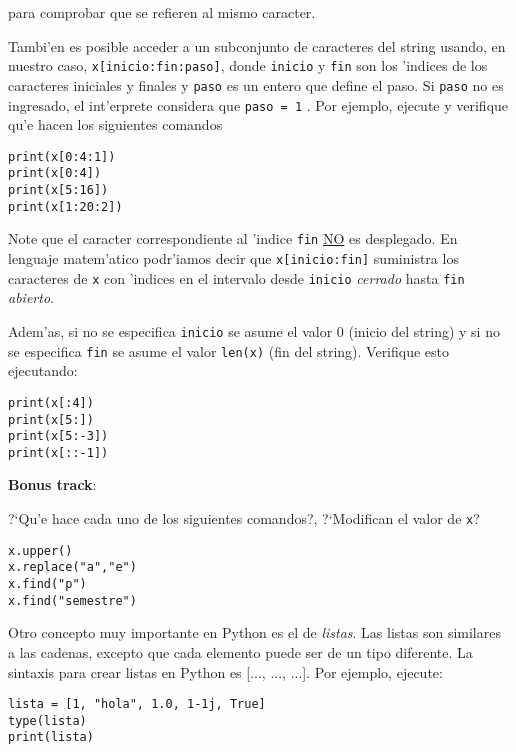 \documentclass[11pt]{exam}
\begin{document}
\begin{questions}
para comprobar que se refieren al mismo caracter.

\item Tambi'en es posible acceder a un subconjunto de caracteres del string usando, en nuestro caso, \texttt{x[inicio:fin:paso]}, donde \texttt{inicio} y \texttt{fin} son los 'indices de los caracteres iniciales y finales y \texttt{paso} es un entero que define el paso. Si \texttt{paso} no es ingresado, el int'erprete considera que \texttt{paso = 1} . Por ejemplo, ejecute y verifique qu'e hacen los siguientes comandos

\begin{verbatim}
print(x[0:4:1])
print(x[0:4])
print(x[5:16])
print(x[1:20:2])
\end{verbatim}

Note que el caracter correspondiente al 'indice \texttt{fin} \underline{NO} es desplegado. En lenguaje matem'atico podr'iamos decir que \texttt{x[inicio:fin]} suministra los caracteres de \texttt{x} con 'indices en el intervalo desde \texttt{inicio} \textit{cerrado} hasta \texttt{fin} \textit{abierto}.

\item Adem'as, si no se especifica \texttt{inicio} se asume el valor 0 (inicio del string) y si no se especifica \texttt{fin} se asume el valor \texttt{len(x)} (fin del string). Verifique esto ejecutando:

\begin{verbatim}
print(x[:4])
print(x[5:])
print(x[5:-3])
print(x[::-1])
\end{verbatim}

\item \textbf{Bonus track}: 

?`Qu'e hace cada uno de los siguientes comandos?, ?`Modifican el valor de \texttt{x}?

\begin{verbatim}
x.upper()
x.replace("a","e")
x.find("p")
x.find("semestre")
\end{verbatim}

\item Otro concepto muy importante en Python es el de \textit{listas}. Las listas son  similares a las cadenas, excepto que cada elemento puede ser de un tipo diferente. La sintaxis para crear listas en Python es [..., ..., ...]. Por ejemplo, ejecute:

\begin{verbatim}
lista = [1, "hola", 1.0, 1-1j, True]
type(lista)
print(lista)
\end{verbatim}


\end{questions}
\end{document}
